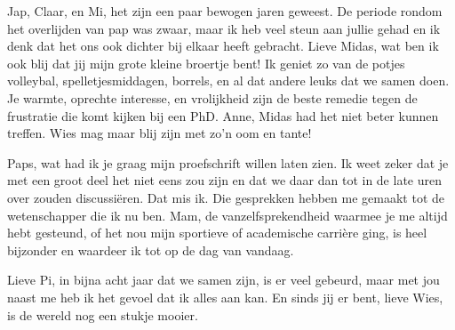 \documentclass[11pt,american,a4paper,oneside,]{memoir} %
\begin{document}
Jap, Claar, en Mi, het zijn een paar bewogen jaren geweest. De periode rondom het overlijden van pap was zwaar, maar ik heb veel steun aan jullie gehad en ik denk dat het ons ook dichter bij elkaar heeft gebracht. Lieve Midas, wat ben ik ook blij dat jij mijn grote kleine broertje bent! Ik geniet zo van de potjes volleybal, spelletjesmiddagen, borrels, en al dat andere leuks dat we samen doen. Je warmte, oprechte interesse, en vrolijkheid zijn de beste remedie tegen de frustratie die komt kijken bij een PhD. Anne, Midas had het niet beter kunnen treffen. Wies mag maar blij zijn met zo'n oom en tante!

Paps, wat had ik je graag mijn proefschrift willen laten zien. Ik weet zeker dat je met een groot deel het niet eens zou zijn en dat we daar dan tot in de late uren over zouden discussiëren. Dat mis ik. Die gesprekken hebben me gemaakt tot de wetenschapper die ik nu ben. Mam, de vanzelfsprekendheid waarmee je me altijd hebt gesteund, of het nou mijn sportieve of academische carrière ging, is heel bijzonder en waardeer ik tot op de dag van vandaag.

Lieve Pi, in bijna acht jaar dat we samen zijn, is er veel gebeurd, maar met jou naast me heb ik het gevoel dat ik alles aan kan. En sinds jij er bent, lieve Wies, is de wereld nog een stukje mooier.

\backmatter
\end{document}

